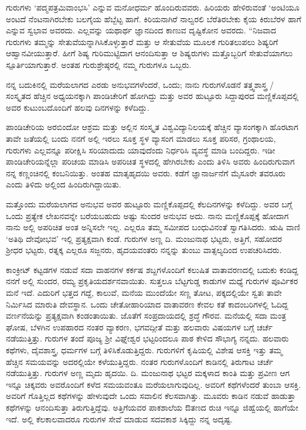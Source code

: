 {ಗುರುಗಳು ‘ಪದ್ಮಪತ್ರಮಿವಾಂಭಸಿ’ ಎನ್ನುವ ಮನೋಧರ್ಮ ಹೊಂದಿರುವವರು. ಹಿರಿಯರು ಹೇಳಿರುವಂತೆ ‘ಅಂಟಿಯೂ ಅಂಟದೆ ನೆಂಟನಾಗಿರಬೇಕು ಬಲಗೈಯ ಹೆಬ್ಬೆಟ್ಟ ಹಾಗೆ. ಕಿರಿಯನಾಗಿರೆ ನಾಲ್ವರಲಿ ಬೆರೆತಿರಬೇಕು ಕೈಯ ಕಿರುಬೆರಳ ಹಾಗೆ ಎನ್ನುವ ಸ್ವಭಾವ ಅವರದು. ಎಲ್ಲವನ್ನು ಯಥಾರ್ಥ ಜ್ಞಾನದಿಂದ ಕಾಣುವ ದೃಷ್ಟಿಕೋನ ಅವರದು. “ನಿಜವಾದ ಗುರುಗಳು ತಮ್ಮನ್ನು ಸೇತುವೆಯನ್ನಾಗಿಸಿಕೊಳ್ಳುತ್ತಾರೆ ಮತ್ತು ಆ ಸೇತುವೆಯ ಮೂಲಕ ಗುರಿತಲುಪಲು ಶಿಷ್ಯರಿಗೆ ಆಹ್ವಾನವೀಯುತ್ತಾರೆ. ಹೀಗೆ ಶಿಷ್ಯ ಗುರಿಮುಟ್ಟಿದಾಗ ಆನಂದಿಸುತ್ತಾ ಆ ಶಿಷ್ಯರುಗಳು ಮತ್ತೊಬ್ಬರಿಗೆ ಸೇತುವೆಯಾಗಲು ಸ್ಪೂರ್ತಿಯಾಗುತ್ತಾರೆ. ಅಂತಹ ಗುರುಶ್ರೇಷ್ಠರಲ್ಲಿ ನಮ್ಮ ಗುರುಗಳೂ ಒಬ್ಬರು.

ನನ್ನ ಬದುಕಿನಲ್ಲಿ ಮರೆಯಲಾಗದ ಎರಡು ಅನುಭವಗಳೆಂದರೆ, ಒಂದು; ನಾನು ಗುರುಗಳೊಡನೆ ತತ್ತ್ವಶಾಸ್ತ್ರ / ಸಂಸ್ಕೃತದ ಹೆಚ್ಚಿನ ಅಧ್ಯಯನಕ್ಕಾಗಿ ಪಾಂಡಿಚೇರಿಗೆ ಹೋಗಿದ್ದು ಮತ್ತು ಅವರ ಹುಟ್ಟೂರು ಸಿದ್ದಾಪುರದ ಮಣ್ಣಿಕೊಪ್ಪದಲ್ಲಿ ಅವರ ಕುಟುಂಬ\-ದೊಂದಿಗೆ ಹಲವು ದಿನಗಳನ್ನು ಕಳೆದಿದ್ದು.

ಪಾಂಡಿಚೇರಿಯ ಅರಬಿಂದೋ ಆಶ್ರಮ ಮತ್ತು ಅಲ್ಲಿನ ಸಂಸ್ಕೃತ ವಿಶ್ವವಿದ್ಯಾ\-ನಿಲಯಕ್ಕೆ ಹೆಚ್ಚಿನ ವ್ಯಾಸಂಗಕ್ಕಾಗಿ ಹೊರಟಾಗ ತಾವೇ ಜತೆಯಲ್ಲಿ ಬಂದು ನನಗೆ ಅಲ್ಲಿ ಇರಲು ಸೂಕ್ತ ಸ್ಥಳ ವ್ಯಾಸಂಗ ಮಾಡಲು ಸೂಕ್ತ ಪರಿಸರ, ಗ್ರಂಥಾಲಯ, ಗುರುಗಳು ಎಲ್ಲವನ್ನೂ ಪರೀಕ್ಷಿಸಿ ಸರಿಯಾದುದು ಯಾವುದೆಂದು ನಿರ್ಧರಿಸಿ ವ್ಯವಸ್ಥೆ ಮಾಡಿ ಬಂದಿದ್ದರು. ಇಡೀ ಪಾಂಡಿಚೇರಿಯನ್ನೆಲ್ಲಾ ಪರಿಚಯ ಮಾಡಿಸಿ ಅಪರಿಚಿತ ಸ್ಥಳದಲ್ಲಿ ಹೇಗಿರ\-ಬೇಕು ಎಂದು ತಿಳಿಸಿ ಅವರು ಹಿಂದಿರುಗುವಾಗ ನನ್ನ ಕಣ್ಣಂಚಿನಲ್ಲಿ ಕಂಬನಿಯಿತ್ತು. ಅಂತಹ ಮಾತೃಹೃದಯಿ ಅವರು. ಕಡೆಗೆ ಜ್ಞಾನಾರ್ಜನೆಗೆ ಮೈಸೂರೇ ತವರೂರು ಎಂದು ತಿಳಿದು ಅಲ್ಲಿಂದ ಹಿಂದಿರುಗಿದ್ದಾಯಿತು.

ಮತ್ತೊಂದು ಮರೆಯಲಾಗದ ಅನುಭವ ಅವರ ಹುಟ್ಟೂರು ಮಣ್ಣಿಕೊಪ್ಪದಲ್ಲಿ ಕೆಲದಿನಗಳನ್ನು ಕಳೆದಿದ್ದು. ಅವರ ಬಗ್ಗೆ ಒಂದು ಪ್ರತ್ಯೇಕ ಲೇಖನವನ್ನೇ ಬರೆಯಬಹುದು ಅಷ್ಟು ಸುಂದರ ಅನುಭವ ಅದು. ನಾನು ಮಣ್ಣಿಕೊಪ್ಪಕ್ಕೆ ಹೋದಾಗ ನಾನು ಅಲ್ಲಿ ಅಪರಿಚಿತ ಅಂತ ಅನ್ನಿಸಲೇ ಇಲ್ಲ. ಎಲ್ಲರೂ ತಮ್ಮ ಸಮೀಪದ ಬಂಧುವಿನಂತೆ ಸ್ವಾಗತಿಸಿದರು. ಋಷಿ ವಾಣಿ ‘ಅತಿಥಿ ದೇವೋಭವ’ ಇಲ್ಲಿ ಪ್ರತ್ಯಕ್ಷವಾಗಿ ಕಂಡೆ. ಗುರುಗಳ ಅಣ್ಣ ದಿ. ಮಂಜುನಾಥ ಭಟ್ಟರು, ಅತ್ತಿಗೆ, ಸಹೋದರ ಶ್ರೀಧರ ಭಟ್ಟರು, ರತ್ನಕ್ಕ ಎಲ್ಲರೂ ಸಜ್ಜನರು, ಹೃದಯವಂತರು ನನ್ನನ್ನು ತುಂಬು ವಾತ್ಸಲ್ಯದಿಂದ ಉಪಚರಿಸಿದರು.

ಕಾಂಕ್ರೀಟ್ ಕಟ್ಟಡಗಳ ನಡುವೆ ಸದಾ ವಾಹನಗಳ ಕರ್ಕಷ ಶಬ್ದಗಳೊಂದಿಗೆ ಕಲುಷಿತ ವಾತಾವರಣದಲ್ಲಿ ಬದುಕು ಕಂಡಿದ್ದ ನನಗೆ ಅಲ್ಲಿ ಸುಂದರ, ರಮ್ಯ ಪ್ರಕೃತಿಯ\break ದರ್ಶನವಾಯಿತು. ಸುತ್ತಲೂ ಬೆಟ್ಟ\enginline{-}ಗುಡ್ಡ ಕಾಡುಗಳ ಮಧ್ಯೆ ಗುರುಗಳ ಪೂರ್ವಿಕರ ಮನೆ ಇದೆ. ಎದುರಿಗೆ ಭತ್ತದ ಗದ್ದೆ, ಕಾಲುವೆ, ಮನೆಯ ಮುಂದೆಯೇ ಸಣ್ಣ ತೋಟ, ಪಕ್ಕದಲ್ಲಿಯೇ ಸ್ವತಃ ತಾವೇ ನಿರ್ಮಿಸಿದ ಮಾರುತಿ ದೇವಸ್ಥಾನ. ಒಂದು ಚೇತೋಹಾರಿಯಾದ ವಾತಾವರಣ ಕೇವಲ ಕತೆ ಕಾದಂಬರಿಗಳಲ್ಲಿ ಓದಿದ್ದ ವರ್ಣನೆಯನ್ನು ಪ್ರತ್ಯಕ್ಷವಾಗಿ ಕಂಡಂತಾಯಿತು. ಜೊತೆಗೆ ಸಂಪ್ರದಾಯದಲ್ಲಿ ಶ್ರದ್ಧೆ ಗೌರವ. ಮನೆಯಲ್ಲಿ ಸದಾ ಮಂತ್ರ ಘೋಷ, ಬೆಳಗಿನ ಉಪಹಾರದ ನಂತರ ವ್ಯಾಕರಣ, ಭಗವದ್ಗೀತೆ ಮತ್ತು ಹಲವಾರು ವಿಷಯಗಳ ಬಗ್ಗೆ ಚರ್ಚೆ ನಡೆಯುತ್ತಿತ್ತು. ಗುರುಗಳ ತಂದೆ ಪೂಜ್ಯ ಶ್ರೀ ವಿಘ್ನೇಶ್ವರ ಭಟ್ಟರಿಂದಲೂ ಪಾಠ ಕೇಳಿದ ಸೌಭಾಗ್ಯ ನನ್ನದು. ಹಲವಾರು ಕಥೆಗಳು, ದೈವಶಾಸ್ತ್ರ, ಧರ್ಮಗಳ ಬಗ್ಗೆ ತಿಳಿಸಿಕೊಡುತ್ತಿದ್ದರು. ಗುರುಗಳಿಗೆ ಕೃಷಿಯಲ್ಲಿ ವಿಶೇಷ ಆಸಕ್ತಿ ಇತ್ತು ತಮ್ಮ ಹೆಚ್ಚಿನ ಸಮಯವನ್ನು ಅದರಲ್ಲಿಯೇ ಕಳೆಯುತ್ತಿದ್ದರು. ನಂತರ ಗುರುಗಳೊಂದಿಗೆ ಕಾಡಿನಲ್ಲಿ ತಿರುಗಾಟ ಚರ್ಚೆ ನಡೆಯುತ್ತಿತ್ತು. ಗುರುಗಳ ಅಣ್ಣ ಮೃದು ಹೃದಯಿ. ದಿ. ಮಂಜುನಾಥ ಭಟ್ಟರ ಮಕ್ಕಳಾದ ಕಾಂತಿ ಮತ್ತು ಪ್ರವೀಣ ಆಗ ಇನ್ನೂ ಚಿಕ್ಕವರು ಅವರೊಂದಿಗೆ ಕಳೆದ ಸಮಯವಂತೂ ಮರೆಯಲಾಗುವುದಿಲ್ಲ. ಅವರಿಗೆ ಕಥೆಗಳೆಂದರೆ ತುಂಬಾ ಆಸಕ್ತಿ. ಅವರಿಗೆ ಗೊತ್ತಿಲ್ಲದ ಕಥೆಗಳನ್ನು ಹೇಳುವುದೇ ಒಂದು ಸವಾಲಿನ ಕೆಲಸ\-ವಾಗಿತ್ತು. ಮೂವರು ಕಾಡಿನ ನಡುವೆ ಹಾಡುತ್ತಾ ಕಥೆಗಳನ್ನು ಆನಂದಿಸುತ್ತಾ ತಿರುಗುತ್ತಿದ್ದೆವು. ಅತ್ತಿಗೆಯವರ ಪಾಕಶಾಲೆಯ ಔತಣದ ರುಚಿ ಇನ್ನೂ ಜಿಹ್ವೆಯಲ್ಲಿ ಹಾಗೆಯೇ ಇದೆ. ಅಲ್ಲಿ ಕೆಲಕಾಲವಾದರೂ ಗುರುಗಳ ಸೇವೆ ಮಾಡುವ ಸದವಕಾಶ ಸಿಕ್ಕಿದ್ದು ನನ್ನ ಅದೃಷ್ಟ.

}
